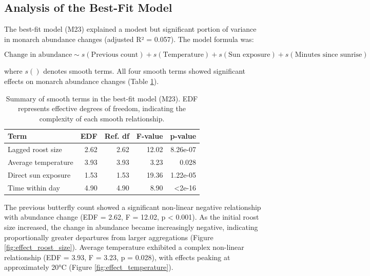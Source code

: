 \subsection{Analysis of the Best-Fit Model}

The best-fit model (M23) explained a modest but significant portion of variance in monarch abundance changes (adjusted R² = 0.057). The model formula was:

\begin{equation}
\text{Change in abundance} \sim s(\text{Previous count}) + s(\text{Temperature}) + s(\text{Sun exposure}) + s(\text{Minutes since sunrise})
\end{equation}

where $s()$ denotes smooth terms. All four smooth terms showed significant effects on monarch abundance changes (Table \ref{tab:smooth_terms}).

\begin{table}[htbp]
\centering
\caption{Summary of smooth terms in the best-fit model (M23). EDF represents effective degrees of freedom, indicating the complexity of each smooth relationship.}
\label{tab:smooth_terms}
\begin{tabular}{lrrrr}
\hline
Term & EDF & Ref. df & F-value & p-value \\
\hline
Lagged roost size & 2.62 & 2.62 & 12.02 & 8.26e-07 \\
Average temperature & 3.93 & 3.93 & 3.23 & 0.028 \\
Direct sun exposure & 1.53 & 1.53 & 19.36 & 1.22e-05 \\
Time within day & 4.90 & 4.90 & 8.90 & <2e-16 \\
\hline
\end{tabular}
\end{table}

The previous butterfly count showed a significant non-linear negative relationship with abundance change (EDF = 2.62, F = 12.02, p < 0.001). As the initial roost size increased, the change in abundance became increasingly negative, indicating proportionally greater departures from larger aggregations (Figure \ref{fig:effect_roost_size}). Average temperature exhibited a complex non-linear relationship (EDF = 3.93, F = 3.23, p = 0.028), with effects peaking at approximately 20°C (Figure \ref{fig:effect_temperature}).

